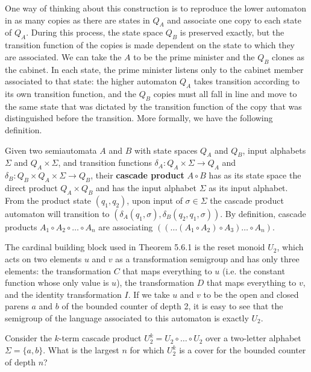 One way of thinking about this construction is to reproduce the lower
automaton in as many copies as there are states in $Q_A$ and associate one
copy to each state of $Q_A$. During this process, the state space $Q_B$ is
preserved exactly, but the transition function of the copies is made dependent
on the state to which they are associated. We can take the $A$ to be the prime
minister and the $Q_B$ clones as the cabinet. In each state, the prime
minister listens only to the cabinet member associated to that state: the
higher automaton $Q_A$ takes transition according to its own transition
function, and the $Q_B$ copies must all fall in line and move to the same
state that was dictated by the transition function of the copy that was
distinguished before the transition. More formally, we have the following
definition.

\medskip{} Given two semiautomata $A$ and $B$
with state spaces $Q_A$ and $Q_B$, input alphabets $\Sigma$ and $Q_A \times
\Sigma$, and transition functions $\delta_A: Q_A \times \Sigma \rightarrow
Q_A$ and $\delta_B: Q_B \times Q_A \times \Sigma \rightarrow Q_B$, their {\bf
  cascade product} $A \circ B$ has as its state
space the direct product $Q_A \times Q_B$ and has the input alphabet $\Sigma$
as its input alphabet. From the product state $(q_1,q_2)$, upon input of
$\sigma \in \Sigma$ the cascade product automaton will transition to
$(\delta_A(q_1,\sigma),\delta_B(q_2,q_1,\sigma))$. By definition, cascade
products $A_1 \circ A_2 \circ \ldots \circ A_n$ are associating $ ( (\ldots
(A_1 \circ A_2) \circ A_3) \ldots \circ A_n)$.

\smallskip\noindent The cardinal building block used in Theorem 5.6.1 is the
reset monoid $U_2$, which acts on two elements $u$ and $v$ as a transformation
semigroup and has only three elements: the transformation $C$ that maps
everything to $u$ (i.e. the constant function whose only value is $u$), the
transformation $D$ that maps everything to $v$, and the identity
transformation $I$. If we take $u$ and $v$ to be the open and closed parens $a$
and $b$ of the bounded counter of depth 2, it is easy to see that the
semigroup of the language associated to this automaton is exactly $U_2$. 

\smallskip{} Consider the $k$-term cascade product
$U_2^k = U_2 \circ \ldots \circ U_2$ over a two-letter alphabet $\Sigma =
\{a,b\}$. What is the largest $n$ for which $U_2^k$ is a cover for the bounded
counter of depth $n$?

